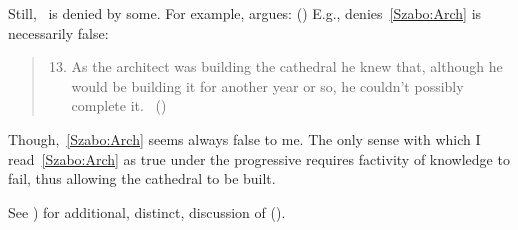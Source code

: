 \begin{note}
{    Still,~ is denied by some.
    For example, \citeauthor{Szabo:2004ul} argues:
    (\citeyear[40]{Szabo:2004ul})
    E.g., \citeauthor{Szabo:2004ul} denies~\ref{Szabo:Arch} is necessarily false:
    \begin{quote}
      \begin{enumerate}[label=(\arabic*), ref=(\arabic*)]
        \setcounter{enumi}{12}
      \item
        \label{Szabo:Arch}
        As the architect was building the cathedral he knew that, although he would be building it for another year or so, he couldn't possibly complete it.%
        \mbox{ }\hfill\mbox{(\citeyear[38]{Szabo:2004ul})}
      \end{enumerate}
    \end{quote}
    Though,~\ref{Szabo:Arch} seems always false to me.
    The only sense with which I read~\ref{Szabo:Arch} as true under the progressive requires factivity of knowledge to fail, thus allowing the cathedral to be built.

    See \cite[1245]{Portner:2011vi}) for additional, distinct, discussion of (\cite{Szabo:2004ul}).
  }

\end{note}



